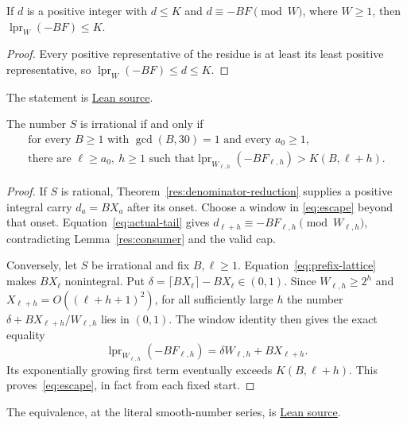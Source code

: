 \documentclass[11pt]{article}
\begin{document}
\begin{lemma}\label{res:consumer}
If $d$ is a positive integer with $d\le K$ and $d\equiv -BF\pmod W$,
where $W\ge1$, then $\operatorname{lpr}_W(-BF)\le K$.
\end{lemma}
\begin{proof}
Every positive representative of the residue is at least its least
positive representative, so $\operatorname{lpr}_W(-BF)\le d\le K$.
\end{proof}

\noindent The statement is \href{https://github.com/wcook04/plectis-erdos/blob/f36a98bf3d3e6f65f1074e3b800e3293d5b8a51a/ErdosProblems/Erdos269/PaperR7BasicAssembly.lean#L138}{Lean source}.

\begin{theorem}\label{res:windowconsumer}
The number $S$ is irrational if and only if
\begin{equation}\label{eq:escape}
 \begin{gathered}
 \text{for every }B\ge1\text{ with }\gcd(B,30)=1
 \text{ and every }a_0\ge1,\\
 \text{there are }\ell\ge a_0,\ h\ge1\text{ such that}
 \operatorname{lpr}_{W_{\ell,h}}(-BF_{\ell,h})>K(B,\ell+h).
 \end{gathered}
\end{equation}
\end{theorem}
\begin{proof}
If $S$ is rational, Theorem~\ref{res:denominator-reduction} supplies a
positive integral carry $d_a=BX_a$ after its onset.  Choose a window in
\eqref{eq:escape} beyond that onset.  Equation~\eqref{eq:actual-tail}
gives $d_{\ell+h}\equiv-BF_{\ell,h}\pmod{W_{\ell,h}}$, contradicting
Lemma~\ref{res:consumer} and the valid cap.

Conversely, let $S$ be irrational and fix $B,\ell\ge1$.
Equation~\eqref{eq:prefix-lattice} makes $BX_\ell$ nonintegral.
Put $\delta=\lceil BX_\ell\rceil-BX_\ell\in(0,1)$.
Since $W_{\ell,h}\ge2^h$ and $X_{\ell+h}=O((\ell+h+1)^2)$, for all
sufficiently large $h$ the number
$\delta+BX_{\ell+h}/W_{\ell,h}$ lies in $(0,1)$.  The window identity
then gives the exact equality
\[
 \operatorname{lpr}_{W_{\ell,h}}(-BF_{\ell,h})
 =\delta W_{\ell,h}+BX_{\ell+h}.
\]
Its exponentially growing first term eventually exceeds
$K(B,\ell+h)$.  This proves~\eqref{eq:escape}, in fact from each fixed start.
\end{proof}

\noindent The equivalence, at the literal smooth-number series, is
\href{https://github.com/wcook04/plectis-erdos/blob/f36a98bf3d3e6f65f1074e3b800e3293d5b8a51a/ErdosProblems/Erdos269/PaperR7WindowResults.lean#L51}{Lean source}.
\end{document}
